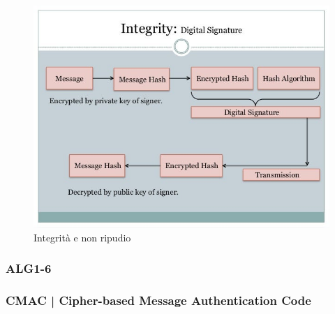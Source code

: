
\textsf{\small }

\begin{figure}[H]
	\centering
	\includegraphics[width=.9\textwidth, height=.9\textheight, keepaspectratio]{./images/aes_modes/encryption-integrity-and-nonrepudiation.png}
	\caption{Integrità e non ripudio}
	\label{fig:encryption-integrity-and-nonrepudiation}
\end{figure}

\subsubsection{ALG1-6}


\textsf{\small }

\subsubsection{CMAC | Cipher-based Message Authentication Code}


\textsf{\small }

